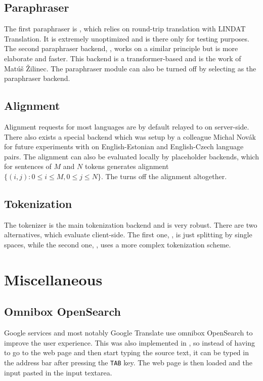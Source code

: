 \subsection*{Paraphraser}

The first paraphraser is , which relies on round-trip translation with LINDAT Translation. It is extremely unoptimized and is there only for testing purposes. The second paraphraser backend, , works on a similar principle but is more elaborate and faster. This backend is a transformer-based and is the work of Matúš Žilinec. The paraphraser module can also be turned off by selecting  as the paraphraser backend.

\subsection*{Alignment}

Alignment requests for most languages are by default relayed to  on server-side. There also exists a special backend  which was setup by a colleague Michal Novák for future experiments with \ptakopet{} on English-Estonian and English-Czech language pairs. The alignment can also be evaluated locally by  placeholder backends, which for sentences of $M$ and $N$ tokens generates alignment $\{(i, j): 0 \le i \le M, 0 \le j \le N\}$. The  turns off the alignment altogether.

\subsection*{Tokenization}

The  tokenizer is the main tokenization backend and is very robust. There are two alternatives, which evaluate client-side. The first one, , is just splitting by single spaces, while the second one, , uses a more complex tokenization scheme.

\section{Miscellaneous}

\subsection*{Omnibox OpenSearch}
Google services and most notably Google Translate use omnibox OpenSearch to improve the user experience. This was also implemented in \ptakopet{}, so instead of having to go to the web page and then start typing the source text, it can be typed in the address bar after pressing the \texttt{TAB} key. The web page is then loaded and the input pasted in the input textarea.

